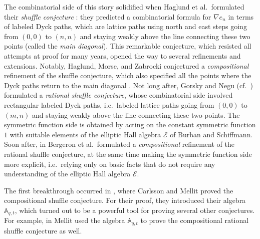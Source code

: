 \documentclass[reqno]{amsart}
\theoremstyle{plain}
\theoremstyle{definition}
\theoremstyle{remark}
\newcommand{\A}{\mathbb{A}}%
\newcommand{\<}{\langle}
\renewcommand{\>}{\rangle}
\begin{document}
The combinatorial side of this story solidified when Haglund et al.\ formulated their \emph{shuffle conjecture} \cite{HaglundHaimanLoehrRemmelUlyanov2005ShuffleConjecture}: they predicted a combinatorial formula for $\nabla e_n$ in terms of labeled Dyck paths, which are lattice paths using north and east steps going from $(0,0)$ to $(n,n)$ and staying weakly above the line connecting these two points (called the \emph{main diagonal}). This remarkable conjecture, which resisted all attempts at proof for many years, opened the way to several refinements and extensions. Notably, Haglund, Morse, and Zabrocki conjectured a \emph{compositional} refinement of the shuffle conjecture, which also specified all the points where the Dyck paths return to the main diagonal \cite{HaglundMorseZabrocki2012CompositionalShuffleConjecture}. Not long after, Gorsky and Negu (cf.\ \cites{GorskyNegut2015RefinedKnotInvariants,Negut2014ShuffleAlgebra}) formulated a \emph{rational shuffle conjecture}, whose combinatorial side involved rectangular labeled Dyck paths, i.e.\ labeled lattice paths going from $(0,0)$ to $(m,n)$ and staying weakly above the line connecting these two points. The symmetric function side is obtained by acting on the constant symmetric function $1$ with suitable elements of the elliptic Hall algebra $\mathcal{E}$ of Burban and Schiffmann. Soon after, in \cite{BergeronGarsiaSergelXin2015CompositionalShuffleConjectures} Bergeron et al.\ formulated a \emph{compositional} refinement of the rational shuffle conjecture, at the same time making the symmetric function side more explicit, i.e.\ relying only on basic facts that do not require any understanding of the elliptic Hall algebra $\mathcal{E}$.

The first breakthrough occurred in \cite{CarlssonMellit2018ShuffleConjecture}, where Carlsson and Mellit proved the compositional shuffle conjecture. For their proof, they introduced their algebra $\A_{q,t}$, which turned out to be a powerful tool for proving several other conjectures. For example, in \cite{Mellit2021Rational} Mellit used the algebra $\A_{q,t}$ to prove the compositional rational shuffle conjecture as well.
\end{document}
